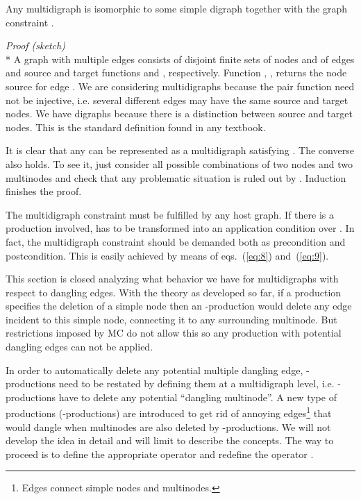 \documentclass{fundam}
\newcommand{\proofend}{\hfill}
\begin{document}
\begin{theorem}
  \label{th:multidigraph}
  Any multidigraph is isomorphic to some simple digraph  together
  with the graph constraint .
\end{theorem}

\noindent \emph{Proof (sketch)}\\*
A graph with multiple edges 
consists of disjoint finite sets  of nodes and  of edges and
source and target functions  and , respectively.  Function , ,  returns
the node source  for edge .  We are considering multidigraphs
because the pair function  need not be
injective, i.e. several different edges may have the same source and
target nodes.  We have digraphs because there is a distinction between
source and target nodes.  This is the standard definition found in any
textbook.

It is clear that any  can be represented as a multidigraph 
satisfying .  The converse also holds.  To see it, just consider
all possible combinations of two nodes and two multinodes and check
that any problematic situation is ruled out by . Induction
finishes the proof.\proofend

The multidigraph constraint  must be fulfilled by any host graph.
If there is a production  involved,  has to be
transformed into an application condition over .  In fact, the
multidigraph constraint should be demanded both as precondition and
postcondition. This is easily achieved by means of eqs.~(\ref{eq:8})
and~(\ref{eq:9}).

This section is closed analyzing what behavior we have for
multidigraphs with respect to dangling edges.  With the theory as
developed so far, if a production specifies the deletion of a simple
node then an -production would delete any edge incident
to this simple node, connecting it to any surrounding multinode.  But
restrictions imposed by MC do not allow this so any production with
potential dangling edges can not be applied.

In order to automatically delete any potential multiple dangling edge,
-productions need to be restated by defining them at a
multidigraph level, i.e.  -productions have to delete any
potential ``dangling multinode''.  A new
type of productions (-productions) are introduced to get rid of
annoying edges\footnote{Edges connect simple nodes and multinodes.}
that would dangle when multinodes are also deleted by
-productions. We will not develop the idea in detail and
will limit to describe the concepts.  The way to proceed is to define
the appropriate operator  and redefine the operator
.
\end{document}
